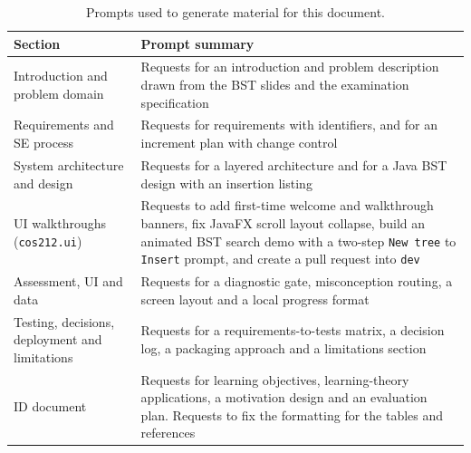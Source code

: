 \begin{table}[H]
\centering
\small
\caption{Prompts used to generate material for this document.}
\label{tab:prompts}
\begin{tabularx}{\textwidth}{p{3.2cm} X}
\toprule
Section & Prompt summary \\
\midrule
Introduction and problem domain & Requests for an introduction and problem description drawn from the BST slides and the examination specification \\
Requirements and SE process & Requests for requirements with identifiers, and for an increment plan with change control \\
System architecture and design & Requests for a layered architecture and for a Java BST design with an insertion listing \\ UI walkthroughs (\texttt{cos212.ui}) & Requests to add first-time welcome and walkthrough banners, fix JavaFX scroll layout collapse, build an animated BST search demo with a two-step \texttt{New tree} to \texttt{Insert} prompt, and create a pull request into \texttt{dev} \\
Assessment, UI and data & Requests for a diagnostic gate, misconception routing, a screen layout and a local progress format \\
Testing, decisions, deployment and limitations & Requests for a requirements-to-tests matrix, a decision log, a packaging approach and a limitations section \\
ID document & Requests for learning objectives, learning-theory applications, a motivation design and an evaluation plan. Requests to fix the formatting for the tables and references \\
\bottomrule
\end{tabularx}
\end{table}

